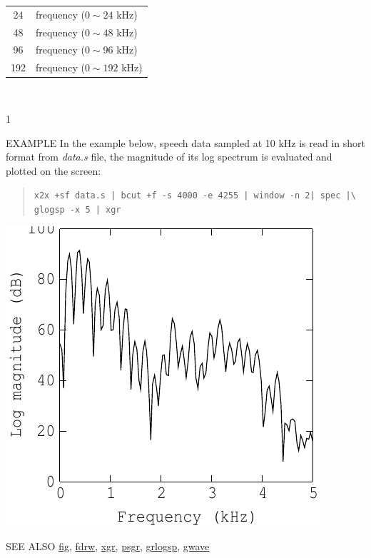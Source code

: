 \begin{options}
{\begin{tabular}{cl}
			24 & frequency ($0 \sim 24$ kHz) \\ 
			48 & frequency ($0 \sim 48$ kHz) \\
                        96 & frequency ($0 \sim 96$ kHz) \\
                        192 & frequency ($0 \sim 192$ kHz)
		       \end{tabular}\\\hspace*{\fill}}{1}
\end{options}

\begin{qsection}{EXAMPLE}
In the example below, speech data sampled at 10 kHz is read
in short format from {\em data.s} file,
the magnitude of its log spectrum is evaluated and plotted on the screen:
\begin{quote}
 \verb!x2x +sf data.s | bcut +f -s 4000 -e 4255 | window -n 2| spec |\! \\
 \verb!glogsp -x 5 | xgr!
\end{quote}
\begin{center}
 \leavevmode
 \includegraphics{fig/glogsp-sample.pdf}
\end{center}
\end{qsection}

\begin{qsection}{SEE ALSO}
\hyperlink{fig}{fig},
\hyperlink{fdrw}{fdrw},
\hyperlink{xgr}{xgr},
\hyperlink{psgr}{psgr},
\hyperlink{grlogsp}{grlogsp},
\hyperlink{gwave}{gwave}
\end{qsection}

